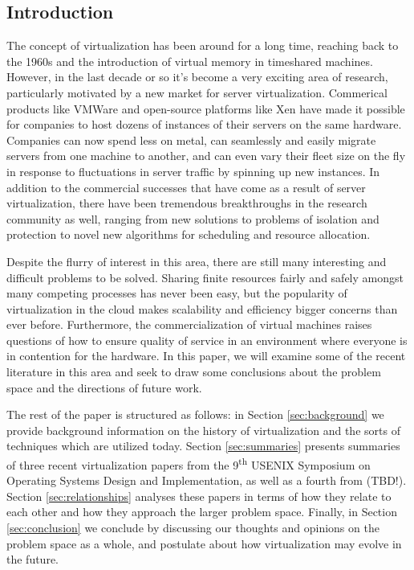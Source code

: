 \documentclass[10pt]{article}
\begin{document}
\begin{multicols*}{2}

\section{Introduction}
\label{sec:intro}

The concept of virtualization has been around for a long time, reaching back
to the 1960s and the introduction of virtual memory in timeshared machines.
However, in the last decade or so it's become a very exciting area of research,
particularly motivated by a new market for server virtualization.  Commerical
products like VMWare and open-source platforms like Xen \cite{ref:xen} have made
it possible for companies to host dozens of instances of their servers
on the same hardware.  Companies can now spend less on metal, can seamlessly and
easily migrate servers from one machine to another, and can even vary their fleet
size on the fly in response to fluctuations in server traffic by spinning up new
instances.  In addition to the commercial successes that have come as a result
of server virtualization, there have been tremendous breakthroughs in the research
community as well, ranging from new solutions to problems of isolation and protection
to novel new algorithms for scheduling and resource allocation.

Despite the flurry of interest in this area, there are still many interesting
and difficult problems to be solved.  Sharing finite resources
fairly and safely amongst many competing processes has never been easy, but
the popularity of virtualization in the cloud makes scalability and efficiency
bigger concerns than ever before.  Furthermore, the commercialization of
virtual machines raises questions of how to ensure quality of service in
an environment where everyone is in contention for the hardware.  In this
paper, we will examine some of the recent literature in this area and
seek to draw some conclusions about the problem space and the directions
of future work.

The rest of the paper is structured as follows: in Section \ref{sec:background}
we provide background information on the history of virtualization and the
sorts of techniques which are utilized today.  Section \ref{sec:summaries}
presents summaries of three recent virtualization papers from the
9\textsuperscript{th} USENIX Symposium on Operating Systems Design
and Implementation, as well as a fourth from (TBD!).  Section
\ref{sec:relationships} analyses these papers in terms of how they
relate to each other and how they approach the larger problem space.
Finally, in Section \ref{sec:conclusion} we conclude by discussing our
thoughts and opinions on the problem space as a whole, and postulate
about how virtualization may evolve in the future.


\end{multicols*}
\end{document}
